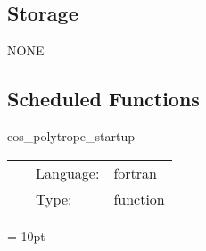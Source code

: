 \documentclass{article}
\begin{document}
\subsection*{Storage}NONE
\subsection*{Scheduled Functions}
\vspace{5mm}


\hspace{5mm} eos\_polytrope\_startup 

\hspace{5mm}{\it setup the polytropic eos } 


\hspace{5mm}

 \begin{tabular*}{160mm}{cll} 
~ & Language:  & fortran \\ 
~ & Type:  & function \\ 
\end{tabular*} 



\vspace{5mm}\parskip = 10pt 
\end{document}
